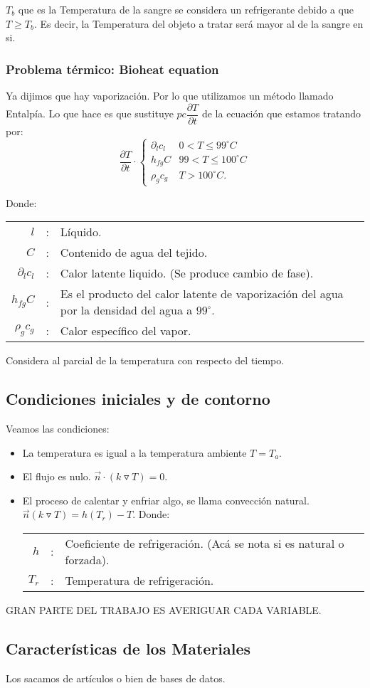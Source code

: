 $T_b$ que es la Temperatura de la sangre se considera un refrigerante debido a que $T\geq T_b$. Es decir, la Temperatura del objeto a tratar será mayor al de la sangre en si.

\subsubsection{Problema térmico: Bioheat equation}
Ya dijimos que hay vaporización. Por lo que utilizamos un método llamado Entalpía. Lo que hace es que sustituye $pc\dfrac{\partial T}{\partial t}$ de la ecuación que estamos tratando por:
$$
\dfrac{\partial T}{\partial t} \cdot \left\{
    \begin{array}{ll}
	\partial_l c_l & 0<T\leq 99^{\circ}C\\
	h_{fg}C & 99<T\leq 100^{\circ}C\\
	\rho_g c_g & T>100^{\circ}C.
    \end{array}
\right.
$$

Donde:
\begin{center}
	\begin{tabular}{rcl}
	    $l$ & : & Líquido.\\
	    $C$ & : & Contenido de agua del tejido.\\
	    $\partial_l c_l$ &:& Calor latente liquido. (Se produce cambio de fase).\\
	    $h_{fg}C$ &:& Es el producto del  calor latente de vaporización del agua por la densidad del agua a $99^{\circ}$.\\
	    $\rho_g c_g$ &:& Calor específico del vapor.
	\end{tabular}
\end{center}

Considera al parcial de la temperatura con respecto del tiempo.

\subsection{Condiciones iniciales y de contorno}

Veamos las condiciones:
\begin{itemize}
    \item La temperatura es igual a la temperatura ambiente $T=T_a$.
    \item El flujo es nulo. $\vec{n}\cdot(k\triangledown T)=0$. 
    \item El proceso de calentar y enfriar algo, se llama convección natural. $\vec{n}(k\triangledown T)=h(T_r)-T$.
	Donde:
	\begin{center}
	    \begin{tabular}{rcl}
		$h$ &:& Coeficiente de refrigeración. (Acá se nota si es natural o forzada).\\
		$T_r$ &:& Temperatura de refrigeración.
	    \end{tabular}
	\end{center}
\end{itemize}

GRAN PARTE DEL TRABAJO ES AVERIGUAR CADA VARIABLE. 


\subsection{Características de los Materiales}
Los sacamos de artículos o bien de bases de datos.



